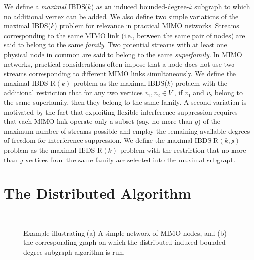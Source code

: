\documentclass[journal,12pt,onecolumn]{IEEEtran}
\begin{document}
We define a {\em maximal} IBDS($k$) as an induced bounded-degree-$k$
subgraph to which no additional
vertex can be added. We also define two simple variations of the
maximal IBDS($k$) problem for relevance in practical MIMO networks. Streams
corresponding to the same MIMO link (i.e., between the same pair of
nodes) are said to belong to the same {\em family}. Two
potential streams with at least one physical node in common are said
to belong to the same {\em superfamily}. In MIMO networks, practical
considerations often impose that a node does not
use two streams corresponding to different MIMO links
simultaneously. We define the maximal IBDS-R$(k)$ problem as 
the maximal IBDS($k$) problem with the additional restriction that for
any two vertices $v_1, v_2 \in V^\prime$, if $v_1$ and $v_2$ belong to
the same superfamily, then they belong to the same family. A second
variation is motivated by the fact that exploiting flexible
interference suppression requires that each MIMO link operate only a
subset (say, no more than $g$) of the maximum number of streams
possible and employ the remaining available degrees of freedom for interference
suppression. We define the maximal IBDS-R$(k,g)$ problem as the 
maximal IBDS-R$(k)$ problem with the restriction that no more than
$g$ vertices from the same family are selected into the maximal 
subgraph. 

\section{The Distributed Algorithm}
\label{sec:algo}

\begin{figure}[!t]
\begin{center}
    \\
    \caption{Example illustrating (a) A simple network of MIMO nodes,
      and (b) the corresponding graph on which the distributed induced
      bounded-degree subgraph algorithm is run.}
\end{center}
\end{figure}
\end{document}

